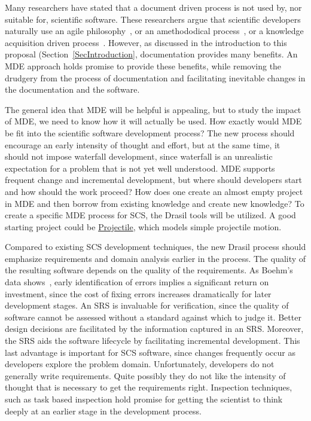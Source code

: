 \documentclass[12pt]{article}
\begin{document}
Many researchers have stated that a document driven process is not used by, nor
suitable for, scientific software.  These researchers argue that scientific
developers naturally use an agile philosophy~\cite{AckroydEtAl2008,
  CarverEtAl2007, EasterbrookAndJohns2009, Segal2005}, or an amethododical
process~\cite{Kelly2013}, or a knowledge acquisition driven
process~\cite{Kelly2015}.  However, as discussed in the introduction to this
proposal (Section~\ref{SecIntroduction}, documentation provides many benefits.
An MDE approach holds promise to provide these benefits, while removing the
drudgery from the process of documentation and facilitating inevitable changes
in the documentation and the software.

The general idea that MDE will be helpful is appealing, but to study the impact
of MDE, we need to know how it will actually be used.  How exactly would MDE be
fit into the scientific software development process?  The new process should
encourage an early intensity of thought and effort, but at the same time, it
should not impose waterfall development, since waterfall is an unrealistic
expectation for a problem that is not yet well understood.  MDE supports
frequent change and incremental development, but where should developers start
and how should the work proceed?  How does one create an almost empty project in
MDE and then borrow from existing knowledge and create new knowledge?  To create
a specific MDE process for SCS, the Drasil tools will be utilized.  A good
starting project could be
\href{https://jacquescarette.github.io/Drasil/examples/Projectile/srs/Projectile_SRS.html}
{Projectile}, which models simple projectile motion.

Compared to existing SCS development techniques, the new Drasil process should
emphasize requirements and domain analysis earlier in the process.  The quality
of the resulting software depends on the quality of the requirements.  As
Boehm's data shows~\cite{Boehm1981}, early identification of errors implies a
significant return on investment, since the cost of fixing errors increases
dramatically for later development stages.  An SRS is invaluable for
verification, since the quality of software cannot be assessed without a
standard against which to judge it. Better design decisions are facilitated by
the information captured in an SRS.  Moreover, the SRS aids the software
lifecycle by facilitating incremental development.  This last advantage is
important for SCS software, since changes frequently occur as developers explore
the problem domain.  Unfortunately, developers do not generally write
requirements.  Quite possibly they do not like the intensity of thought that is
necessary to get the requirements right.  Inspection techniques, such as task
based inspection \citep{KellyAndShepard2000, KellyAndShepard2004} hold promise
for getting the scientist to think deeply at an earlier stage in the development
process.
\end{document}
